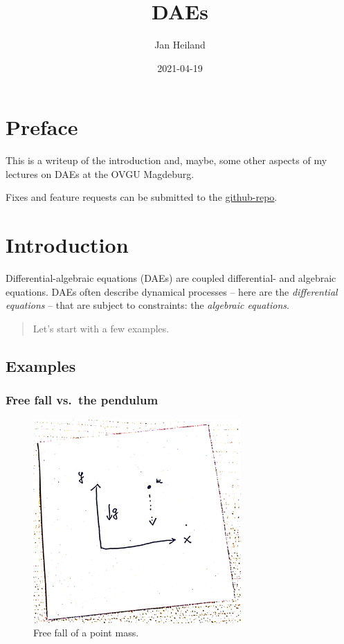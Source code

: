 \documentclass[]{book}
\title{DAEs}
\author{Jan Heiland}
\institute{OVGU/MPI}
\date{2021-04-19}
\newenvironment {JHSAYS} [0] {\begin{quote}\color{jhsc}} {\end{quote}}
\theoremstyle{definition}
\theoremstyle{definition}
\theoremstyle{definition}
\theoremstyle{remark}
\begin{document}
\maketitle

{
\setcounter{tocdepth}{1}
\tableofcontents
}
\hypertarget{preface}{%
\chapter*{Preface}\label{preface}}

This is a writeup of the introduction and, maybe, some other aspects of my lectures on DAEs at the OVGU Magdeburg.

Fixes and feature requests can be submitted to the \href{https://github.com/highlando/script-daes}{github-repo}.

\newcommand{\ind}{\operatorname{ind}}

\hypertarget{introduction}{%
\chapter{Introduction}\label{introduction}}

Differential-algebraic equations (DAEs) are coupled differential- and algebraic equations. DAEs often describe dynamical processes -- here are the \emph{differential equations} -- that are subject to constraints: the \emph{algebraic equations}.

\begin{JHSAYS}
Let's start with a few examples.
\end{JHSAYS}

\hypertarget{examples}{%
\section{Examples}\label{examples}}

\hypertarget{free-fall-vs.-the-pendulum}{%
\subsection*{Free fall vs.~the pendulum}\label{free-fall-vs.-the-pendulum}}

\begin{figure}

{\centering \includegraphics[width=0.4\linewidth]{pics/freefall} 

}

\caption{Free fall of a point mass.}\label{fig:free-fall}
\end{figure}
\end{document}
